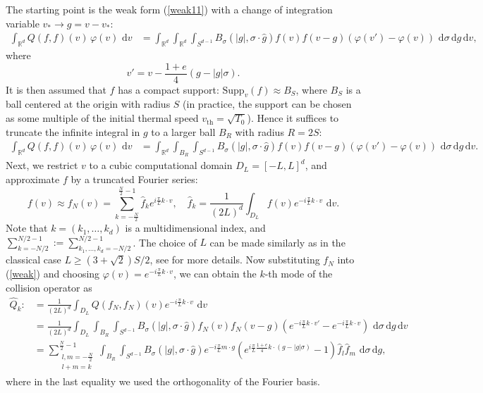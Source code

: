 \documentclass[review,times]{elsarticle}
\newcommand{\rd}{\,\mathrm{d}}
\begin{document}
The starting point is the weak form (\ref{weak11}) with a change of integration variable $v_* \rightarrow g=v-v_*$:
\begin{align} 
\int_{\mathbb{R}^d} Q(f,f)(v)\,\varphi(v)\,\rd{v}&= \int_{\mathbb{R}^d} \int_{\mathbb{R}^d} \int_{S^{d-1}} B_{\sigma}(|g|,\sigma\cdot \hat{g})f(v)f(v-g)  \left(\varphi(v')-\varphi(v)\right)\,\rd{\sigma} \rd{g} \rd{v},
\end{align}
where
\begin{equation}
v'=v-\frac{1+e}{4}(g-|g|\sigma).
\end{equation}
It is then assumed that $f$ has a compact support: $\text{Supp}_v(f) \approx B_S$, where $B_S$ is a ball centered at the origin with radius $S$ (in practice, the support can be chosen as some multiple of the initial thermal speed $v_{\text{th}}=\sqrt{T_0}$). Hence it suffices to truncate the infinite integral in $g$ to a larger ball $B_R$ with radius $R=2S$:
\begin{align}  \label{weak}
\int_{\mathbb{R}^d} Q(f,f)(v)\,\varphi(v)\,\rd{v}&= \int_{\mathbb{R}^d} \int_{B_R} \int_{S^{d-1}} B_{\sigma}(|g|,\sigma\cdot \hat{g})f(v)f(v-g)  \left(\varphi(v')-\varphi(v)\right)\,\rd{\sigma} \rd{g} \rd{v}.
\end{align}
Next, we restrict $v$ to a cubic computational domain $D_L=[-L,L]^d$, and approximate $f$ by a truncated Fourier series:
\begin{equation}
f(v)\approx f_N(v)=\sum_{k=-\frac{N}{2}}^{\frac{N}{2}-1}\hat{f}_k e^{i\frac{\pi}{L}k\cdot v}, \quad \hat{f}_k=\frac{1}{(2L)^d}\int_{D_L}f(v)e^{-i\frac{\pi}{L}k\cdot v}\,\rd{v}.
\end{equation}
Note that $k=(k_1,\dots,k_d)$ is a multidimensional index, and $\sum_{k=-N/2}^{N/2-1}:=\sum_{k_1,\dots,k_d=-N/2}^{N/2-1}$. The choice of $L$ can be made similarly as in the classical case $L\geq (3+\sqrt{2})S/2$, see \cite{PR00} for more details. Now substituting $f_N$ into (\ref{weak}) and choosing $\varphi(v)=e^{-i\frac{\pi}{L}k\cdot v}$, we can obtain the $k$-th mode of the collision operator as
\begin{align} \label{QQ}
\hat{Q}_k:&=\frac{1}{(2L)^d}\int_{D_L}Q(f_N,f_N)(v)e^{-i\frac{\pi}{L}k\cdot v}\,\rd{v}\nonumber\\
&=\frac{1}{(2L)^d}\int_{D_L} \int_{B_R} \int_{S^{d-1}} B_{\sigma}(|g|,\sigma\cdot \hat{g})f_N(v)f_N(v-g)  \left(e^{-i\frac{\pi}{L}k\cdot v'}-e^{-i\frac{\pi}{L}k\cdot v}\right)\,\rd{\sigma} \rd{g} \rd{v}\nonumber\\
&=\sum_{\substack{l,m=-\frac{N}{2}\\l+m=k}}^{\frac{N}{2}-1}\int_{B_R}\int_{S^{d-1}}B_{\sigma}(|g|,\sigma\cdot \hat{g})e^{-i\frac{\pi}{L}m\cdot g}\left(e^{i\frac{\pi}{L}\frac{1+e}{4}k\cdot (g-|g|\sigma)}-1\right)\hat{f}_l\hat{f}_m\,\rd{\sigma} \rd{g},
\end{align}
where in the last equality we used the orthogonality of the Fourier basis.
\end{document}
